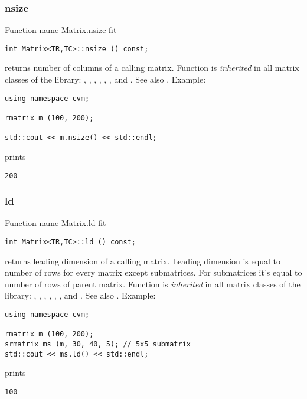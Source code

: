 \subsubsection{nsize}
Function%
\pdfdest name {Matrix.nsize} fit
\begin{verbatim}
int Matrix<TR,TC>::nsize () const;
\end{verbatim}
returns  number of columns of a calling matrix.
Function is \emph{inherited} in all matrix classes
of the library:
,   ,
, ,
, ,
 and .
See also .
Example:
\begin{Verbatim}
using namespace cvm;

rmatrix m (100, 200);

std::cout << m.nsize() << std::endl;
\end{Verbatim}
prints
\begin{Verbatim}
200
\end{Verbatim}
\newpage



\subsubsection{ld}
Function%
\pdfdest name {Matrix.ld} fit
\begin{verbatim}
int Matrix<TR,TC>::ld () const;
\end{verbatim}
returns  leading dimension of a calling matrix.
Leading dimension is equal to  number of rows
for every matrix except submatrices. For submatrices
it's equal to  number of rows of parent matrix.
Function is \emph{inherited} in all matrix classes
of the library:
,   ,
, ,
, ,
 and .
See also .
Example:
\begin{Verbatim}
using namespace cvm;

rmatrix m (100, 200);
srmatrix ms (m, 30, 40, 5); // 5x5 submatrix
std::cout << ms.ld() << std::endl;
\end{Verbatim}
prints
\begin{Verbatim}
100
\end{Verbatim}
\newpage



